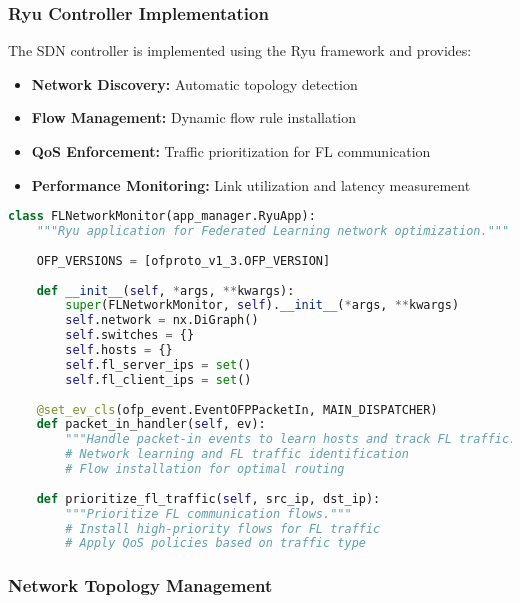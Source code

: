 \documentclass[12pt,a4paper,twoside]{article}
\begin{document}
\subsubsection{Ryu Controller Implementation}

The SDN controller is implemented using the Ryu framework and provides:

\begin{itemize}
    \item \textbf{Network Discovery:} Automatic topology detection
    \item \textbf{Flow Management:} Dynamic flow rule installation
    \item \textbf{QoS Enforcement:} Traffic prioritization for FL communication
    \item \textbf{Performance Monitoring:} Link utilization and latency measurement
\end{itemize}

\begin{lstlisting}[language=python, caption=SDN Controller Core Implementation]
class FLNetworkMonitor(app_manager.RyuApp):
    """Ryu application for Federated Learning network optimization."""
    
    OFP_VERSIONS = [ofproto_v1_3.OFP_VERSION]
    
    def __init__(self, *args, **kwargs):
        super(FLNetworkMonitor, self).__init__(*args, **kwargs)
        self.network = nx.DiGraph()
        self.switches = {}
        self.hosts = {}
        self.fl_server_ips = set()
        self.fl_client_ips = set()
        
    @set_ev_cls(ofp_event.EventOFPPacketIn, MAIN_DISPATCHER)
    def packet_in_handler(self, ev):
        """Handle packet-in events to learn hosts and track FL traffic."""
        # Network learning and FL traffic identification
        # Flow installation for optimal routing
        
    def prioritize_fl_traffic(self, src_ip, dst_ip):
        """Prioritize FL communication flows."""
        # Install high-priority flows for FL traffic
        # Apply QoS policies based on traffic type
\end{lstlisting}

\subsubsection{Network Topology Management}
\end{document}
